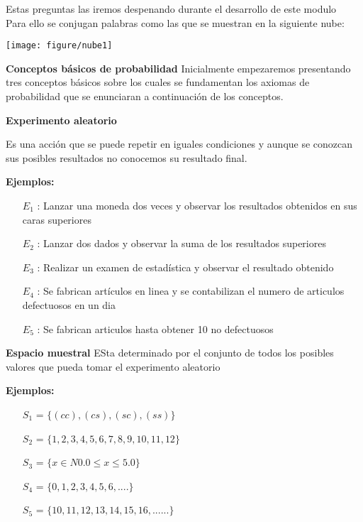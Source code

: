 \documentclass[base=hide,12pt]{elegantbook}
\begin{document}
Estas preguntas las iremos despenando durante el desarrollo de este modulo\\

Para ello se conjugan palabras como las que se muestran en la siguiente nube:
\begin{center}
	\texttt{[image: figure/nube1]}
\end{center}

\textcolor{col4}{\large  \bf Conceptos básicos de probabilidad}
Inicialmente empezaremos presentando tres conceptos básicos sobre los cuales se fundamentan los axiomas de probabilidad que se enunciaran a continuación de los conceptos.\\
\vspace{.5cm}
\begin{Box4}{\bf Experimento aleatorio} 
	
Es una acción que se puede repetir en iguales condiciones  y aunque se conozcan sus posibles resultados no conocemos su resultado final.\\
\end{Box4}
\textcolor{col3}{\bf Ejemplos: }
\begin{itemize}
 \item [$E_{1}$]: Lanzar una moneda dos veces y observar los resultados obtenidos en sus caras superiores
 \item[$E_{2}$]: Lanzar dos dados y observar la suma de los resultados superiores
 \item[$E_{3}$]: Realizar un examen de estadística y observar el resultado obtenido
 \item[$E_{4}$]: Se fabrican artículos en linea y se contabilizan el numero de articulos defectuosos en un dia
 \item[$E_{5}$]: Se fabrican articulos hasta obtener 10 no defectuosos
\end{itemize}
\vspace{.5cm}
\begin{Box4}{\bf Espacio muestral}
ESta determinado por el conjunto de  todos los posibles valores que pueda tomar el experimento aleatorio	
\end{Box4}	
\textcolor{col3}{\bf Ejemplos: }
  \begin{itemize}
    \item[$S_{1}$]= $\{ (cc), (cs), (sc), (ss) \}$
    \item[$S_{2}$]= $\{ 1,2,3,4,5,6,7,8,9,10,11,12 \}$
    \item[$S_{3}$]= $\{ x \in N  0.0 \leq x \leq 5.0 \}$
    \item[$S_{4}$]= $\{0,1,2,3,4,5,6,....\}$
    \item[$S_{5}$]= $\{10,11,12,13,14,15,16,......\}$
  \end{itemize}
\end{document}
